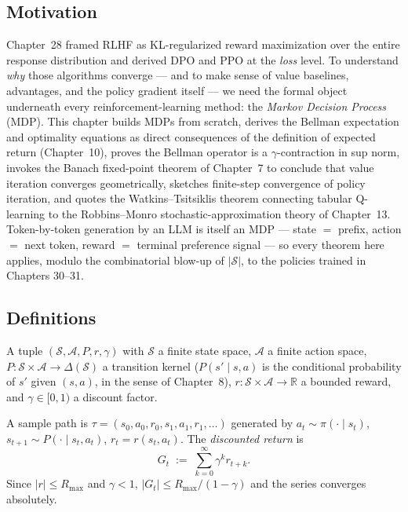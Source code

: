 \subsection*{Motivation}

Chapter~28 framed RLHF as KL-regularized reward maximization over the entire response distribution and derived DPO and PPO at the \emph{loss} level. To understand \emph{why} those algorithms converge --- and to make sense of value baselines, advantages, and the policy gradient itself --- we need the formal object underneath every reinforcement-learning method: the \emph{Markov Decision Process} (MDP). This chapter builds MDPs from scratch, derives the Bellman expectation and optimality equations as direct consequences of the definition of expected return (Chapter~10), proves the Bellman operator is a $\gamma$-contraction in sup norm, invokes the Banach fixed-point theorem of Chapter~7 to conclude that value iteration converges geometrically, sketches finite-step convergence of policy iteration, and quotes the Watkins--Tsitsiklis theorem connecting tabular Q-learning to the Robbins--Monro stochastic-approximation theory of Chapter~13. Token-by-token generation by an LLM is itself an MDP --- state $=$ prefix, action $=$ next token, reward $=$ terminal preference signal --- so every theorem here applies, modulo the combinatorial blow-up of $|\mathcal{S}|$, to the policies trained in Chapters 30--31.

\subsection*{Definitions}

\begin{definition}
A tuple $(\mathcal{S}, \mathcal{A}, P, r, \gamma)$ with $\mathcal{S}$ a finite state space, $\mathcal{A}$ a finite action space, $P : \mathcal{S}\times\mathcal{A} \to \Delta(\mathcal{S})$ a transition kernel ($P(s'\mid s,a)$ is the conditional probability of $s'$ given $(s,a)$, in the sense of Chapter~8), $r : \mathcal{S}\times\mathcal{A} \to \mathbb{R}$ a bounded reward, and $\gamma \in [0,1)$ a discount factor.
\end{definition}

\begin{definition}
A sample path is $\tau = (s_0, a_0, r_0, s_1, a_1, r_1, \dots)$ generated by $a_t \sim \pi(\cdot\mid s_t)$, $s_{t+1}\sim P(\cdot\mid s_t, a_t)$, $r_t = r(s_t, a_t)$. The \emph{discounted return} is
\[
G_t \;:=\; \sum_{k=0}^{\infty}\gamma^k r_{t+k}.
\]
Since $|r|\le R_{\max}$ and $\gamma<1$, $|G_t|\le R_{\max}/(1-\gamma)$ and the series converges absolutely.
\end{definition}

